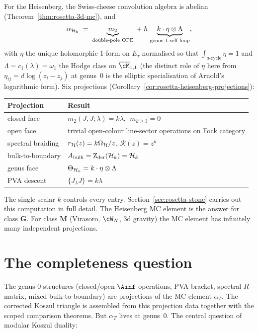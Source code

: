 For the Heisenberg, the Swiss-cheese convolution algebra is
abelian (Theorem~\ref{thm:rosetta-3d-mc}), and
\[
\alpha_{\mathcal{H}_k}
\;=\;
\underbrace{m_2}_{\text{double-pole OPE}}
\;+\;
\hbar\,\underbrace{k \cdot \eta \otimes \Lambda}_{\text{genus-}1
\text{ self-loop}},
\]
with $\eta$ the unique holomorphic 1-form on $E_\tau$ normalised
so that $\int_{a\text{-cycle}}\eta = 1$ and $\Lambda = c_1(\lambda)
= \omega_1$ the Hodge class on $\overline{\cM}_{1,1}$ (the distinct
role of $\eta$ here from $\eta_{ij} = d\log(z_i - z_j)$ at
genus~$0$ is the elliptic specialisation of Arnold's logarithmic form).
Six projections (Corollary~\ref{cor:rosetta-heisenberg-projections}):
\begin{center}
\small
\renewcommand{\arraystretch}{1.15}
\begin{tabular}{ll}
\textbf{Projection} & \textbf{Result} \\
\hline
closed face & $m_2(J,J;\lambda) = k\lambda$, $\;m_{k\ge3} = 0$ \\
open face & trivial open-colour line-sector operations on Fock category \\
spectral braiding & $r_{\mathcal{H}}(z)=k\Omega_{\mathcal{H}}/z$, $\mathcal R(z)=z^k$ \\
bulk-to-boundary & $A_{\mathrm{bulk}} = \operatorname{Z}_{\mathrm{der}}(\mathcal{H}_k) = \mathcal{H}_k$ \\
genus face & $\Theta_{\mathcal{H}_k} = k\cdot\eta\otimes\Lambda$ \\
PVA descent & $\{J_\lambda J\} = k\lambda$
\end{tabular}
\end{center}
The single scalar $k$ controls every entry.
Section~\ref{sec:rosetta-stone} carries out this computation in
full detail. The Heisenberg MC element is the answer for
class $\mathbf{G}$. For class $\mathbf{M}$ (Virasoro, $\cW_N$,
3d gravity) the MC element has infinitely many independent
projections.

\section*{The completeness question}

\providecommand{\Mbar}{\overline{\mathcal M}}
\providecommand{\Mvac}{\cM_{\mathrm{vac}}}

The genus-$0$ structures (closed/open $\Ainf$ operations, PVA
bracket, spectral $R$-matrix, mixed bulk-to-boundary) are
projections of the MC element $\alpha_T$. The corrected Koszul
triangle is assembled from this projection data together with
the scoped comparison theorems. But $\alpha_T$ lives at
genus~$0$. The central question of modular Koszul duality:

